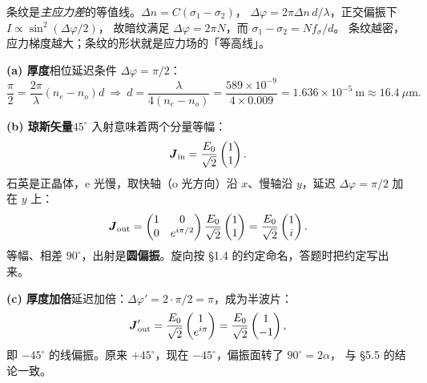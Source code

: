 \documentclass[11pt]{ctexart}
\let\subhdrtheme\subhdr
\renewcommand{\subhdr}[1]{\needspace{4\baselineskip}\subhdrtheme{#1}}
\let\hdrorig\hdr
\renewcommand{\hdr}[2]{\needspace{11\baselineskip}\hdrorig{#1}{#2}}
\begin{document}

条纹是\emph{主应力差}的等值线。$\Delta n=C(\sigma_1-\sigma_2)$，
$\Delta\varphi=2\pi\Delta n\,d/\lambda$，正交偏振下 $I\propto\sin^2(\Delta\varphi/2)$，
故暗纹满足 $\Delta\varphi=2\pi N$，而 $\sigma_1-\sigma_2=Nf_\sigma/d$。
条纹越密，应力梯度越大；条纹的形状就是应力场的「等高线」。



\textbf{(a) 厚度}\quad 相位延迟条件 $\Delta\varphi=\pi/2$：
\[
\frac{\pi}{2}=\frac{2\pi}{\lambda}(n_e-n_o)d
\ \Longrightarrow\
d=\frac{\lambda}{4(n_e-n_o)}
=\frac{589\times10^{-9}}{4\times0.009}
=1.636\times10^{-5}\ \mathrm{m}\approx16.4\ \mu\mathrm{m}.
\]

\textbf{(b) 琼斯矢量}\quad $45^\circ$ 入射意味着两个分量等幅：
\[
\boldsymbol{J}_{\text{in}}=\frac{E_0}{\sqrt2}\begin{pmatrix}1\\1\end{pmatrix}.
\]
石英是正晶体，e 光慢，取快轴（o 光方向）沿 $x$、慢轴沿 $y$，延迟 $\Delta\varphi=\pi/2$ 加在 $y$ 上：
\[
\boldsymbol{J}_{\text{out}}=\begin{pmatrix}1&0\\0&e^{i\pi/2}\end{pmatrix}
\frac{E_0}{\sqrt2}\begin{pmatrix}1\\1\end{pmatrix}
=\frac{E_0}{\sqrt2}\begin{pmatrix}1\\ i\end{pmatrix}.
\]
等幅、相差 $90^\circ$，出射是\textbf{圆偏振}。旋向按 §1.4 的约定命名，答题时把约定写出来。

\textbf{(c) 厚度加倍}\quad 延迟加倍：$\Delta\varphi'=2\cdot\pi/2=\pi$，成为半波片：
\[
\boldsymbol{J}_{\text{out}}'=\frac{E_0}{\sqrt2}\begin{pmatrix}1\\ e^{i\pi}\end{pmatrix}
=\frac{E_0}{\sqrt2}\begin{pmatrix}1\\-1\end{pmatrix},
\]
即 $-45^\circ$ 的线偏振。原来 $+45^\circ$，现在 $-45^\circ$，偏振面转了 $90^\circ=2\alpha$，
与 §5.5 的结论一致。
\end{document}

